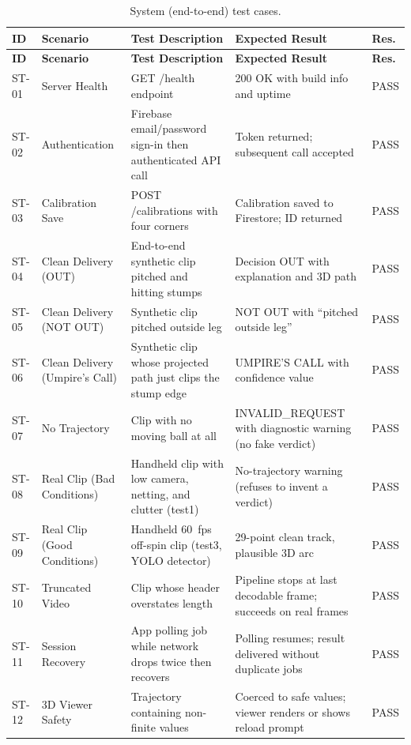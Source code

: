 \documentclass[12pt,a4paper]{report}
\begin{document}
\begin{longtable}{|p{0.9cm}|p{2.4cm}|p{4.6cm}|p{4.0cm}|p{0.8cm}|}
\caption{System (end-to-end) test cases.}\label{tab:system-tests}\\
\hline
\textbf{ID} & \textbf{Scenario} & \textbf{Test Description} & \textbf{Expected Result} & \textbf{Res.} \\
\hline
\endfirsthead
\hline
\textbf{ID} & \textbf{Scenario} & \textbf{Test Description} & \textbf{Expected Result} & \textbf{Res.} \\
\hline
\endhead
ST-01 & Server Health & GET /health endpoint & 200 OK with build info and uptime & PASS \\
\hline
ST-02 & Authentication & Firebase email/password sign-in then authenticated API call & Token returned; subsequent call accepted & PASS \\
\hline
ST-03 & Calibration Save & POST /calibrations with four corners & Calibration saved to Firestore; ID returned & PASS \\
\hline
ST-04 & Clean Delivery (OUT) & End-to-end synthetic clip pitched and hitting stumps & Decision OUT with explanation and 3D path & PASS \\
\hline
ST-05 & Clean Delivery (NOT OUT) & Synthetic clip pitched outside leg & NOT OUT with ``pitched outside leg'' & PASS \\
\hline
ST-06 & Clean Delivery (Umpire's Call) & Synthetic clip whose projected path just clips the stump edge & UMPIRE'S CALL with confidence value & PASS \\
\hline
ST-07 & No Trajectory & Clip with no moving ball at all & INVALID\_REQUEST with diagnostic warning (no fake verdict) & PASS \\
\hline
ST-08 & Real Clip (Bad Conditions) & Handheld clip with low camera, netting, and clutter (test1) & No-trajectory warning (refuses to invent a verdict) & PASS \\
\hline
ST-09 & Real Clip (Good Conditions) & Handheld 60~fps off-spin clip (test3, YOLO detector) & 29-point clean track, plausible 3D arc & PASS \\
\hline
ST-10 & Truncated Video & Clip whose header overstates length & Pipeline stops at last decodable frame; succeeds on real frames & PASS \\
\hline
ST-11 & Session Recovery & App polling job while network drops twice then recovers & Polling resumes; result delivered without duplicate jobs & PASS \\
\hline
ST-12 & 3D Viewer Safety & Trajectory containing non-finite values & Coerced to safe values; viewer renders or shows reload prompt & PASS \\
\hline
\end{longtable}
\end{document}
